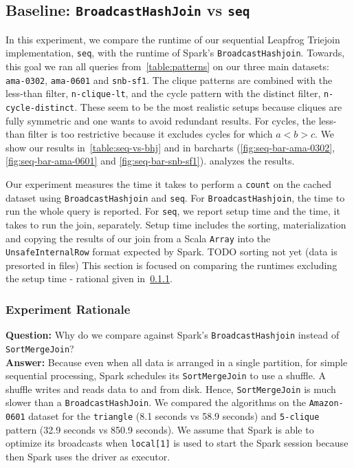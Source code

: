 \subsection{Baseline: \texttt{BroadcastHashJoin} vs \texttt{seq}}

In this experiment, we compare the runtime of our sequential Leapfrog Triejoin implementation, \texttt{seq}, with the runtime of Spark's \texttt{BroadcastHashjoin}.
Towards, this goal we ran all queries from~\cref{table:patterns} on our three main datasets: \texttt{ama-0302}, \texttt{ama-0601} and \texttt{snb-sf1}.
The clique patterns are combined with the less-than filter, \texttt{n-clique-lt}, and the cycle pattern with the distinct filter,
\texttt{n-cycle-distinct}.
These seem to be the most realistic setups because cliques are fully symmetric and one wants to avoid redundant results.
For cycles, the less-than filter is too restrictive because it excludes cycles for which $a < b > c$.
We show our results in~\cref{table:seq-vs-bhj} and in barcharts (\cref{fig:seq-bar-ama-0302}, \ref{fig:seq-bar-ama-0601} and \ref{fig:seq-bar-snb-sf1}).
 analyzes the results.

Our experiment measures the time it takes to perform a \texttt{count} on the cached dataset using \texttt{BroadcastHashjoin} and \texttt{seq}.
For \texttt{BroadcastHashjoin}, the time to run the whole query is reported.
For \texttt{seq}, we report setup time and the time, it takes to run the join, separately.
Setup time includes the sorting, materialization and copying the results of our join from a Scala \texttt{Array} into the \texttt{UnsafeInternalRow} format
expected by Spark.  TODO sorting not yet (data is presorted in files)
This section is focused on comparing the runtimes excluding the setup time - rational given in~\cref{sssec:seq-experiment-rational}.

\subsubsection{Experiment Rationale}\label{sssec:seq-experiment-rational}
\textbf{Question:} Why do we compare against Spark's \texttt{BroadcastHashjoin} instead of \texttt{SortMergeJoin}? \\
\textbf{Answer:} Because even when all data is arranged in a single partition, for simple sequential processing, Spark
schedules its \texttt{SortMergeJoin} to use a shuffle.
A shuffle writes and reads data to and from disk.
Hence, \texttt{SortMergeJoin} is much slower than a \texttt{BroadcastHashJoin}.
We compared the algorithms on the \texttt{Amazon-0601} dataset for the \texttt{triangle} (8.1 seconds vs 58.9 seconds) and
\texttt{5-clique} pattern (32.9 seconds vs 850.9 seconds).
We assume that Spark is able to optimize its broadcasts when \texttt{local[1]} is used to start the Spark session because then Spark uses the driver as executor.

